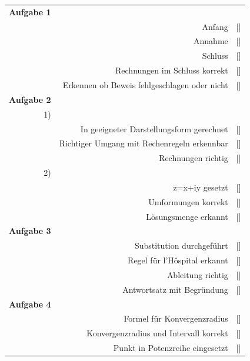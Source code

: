 \documentclass[11pt,final]{scrreprt}
\newcommand{\gbr} {\bigskip\\}
\begin{document}
\begin{tabular}{rrl}
\textbf{Aufgabe 1} &  &  \\ 
 & Anfang & [\hspace*{0.3cm}] \\ 
 & Annahme & [\hspace*{0.3cm}] \\ 
 & Schluss & [\hspace*{0.3cm}] \\ 
 & Rechnungen im Schluss korrekt & [\hspace*{0.3cm}] \\ 
 & Erkennen ob Beweis fehlgeschlagen oder nicht & [\hspace*{0.3cm}] \gbr 
\textbf{Aufgabe 2} &  &  \\ 
1) &  &  \\ 
 & In geeigneter Darstellungsform gerechnet & [\hspace*{0.3cm}] \\ 
 & Richtiger Umgang mit Rechenregeln erkennbar & [\hspace*{0.3cm}] \\ 
 & Rechnungen richtig & [\hspace*{0.3cm}] \\ 
2) &  &  \\ 
 & z=x+iy gesetzt & [\hspace*{0.3cm}] \\ 
 & Umformungen korrekt & [\hspace*{0.3cm}] \\ 
 & Lösungsmenge erkannt & [\hspace*{0.3cm}] \gbr
\textbf{Aufgabe 3} &  &  \\ 
 & Substitution durchgeführt & [\hspace*{0.3cm}] \\ 
 & Regel für l'Hôspital erkannt & [\hspace*{0.3cm}] \\ 
 & Ableitung richtig & [\hspace*{0.3cm}] \\ 
 & Antwortsatz mit Begründung & [\hspace*{0.3cm}] \gbr 
\textbf{Aufgabe 4} &  &  \\ 
 & Formel für Konvergenzradius & [\hspace*{0.3cm}] \\ 
 & Konvergenzradius und Intervall korrekt & [\hspace*{0.3cm}] \\ 
 & Punkt in Potenzreihe eingesetzt & [\hspace*{0.3cm}] \\ 

\end{tabular}
\end{document}
